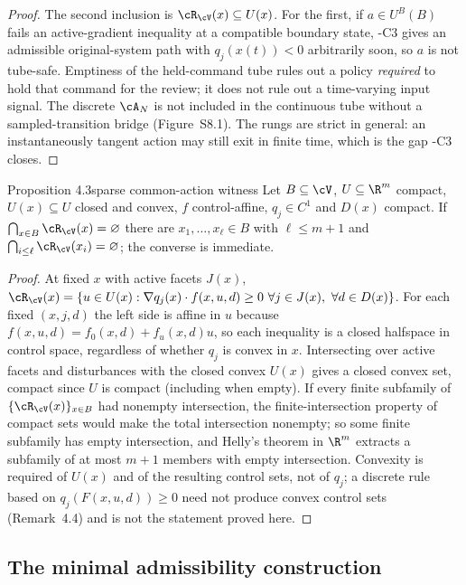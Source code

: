 \begin{proof}
The second inclusion is $\cR_\cV(x)\subseteq U(x)$. For the first, if $a\in U^B(B)$ fails an active-gradient inequality at a compatible boundary state, \hyp{C3} gives an admissible original-system path with $q_j(x(t))<0$ arbitrarily soon, so $a$ is not tube-safe. Emptiness of the held-command tube rules out a policy \emph{required} to hold that command for the review; it does not rule out a time-varying input signal. The discrete $\cA_N$ is not included in the continuous tube without a sampled-transition bridge (Figure~S8.1). The rungs are strict in general: an instantaneously tangent action may still exit in finite time, which is the gap \hyp{C3} closes.
\end{proof}

\begin{restated}{Proposition 4.3}{sparse common-action witness}\label{S:helly}
Let $B\subseteq\cV$, $U\subseteq\R^m$ compact, $U(x)\subseteq U$ closed and convex, $f$ control-affine, $q_j\in C^1$ and $D(x)$ compact. If $\bigcap_{x\in B}\cR_\cV(x)=\varnothing$ there are $x_1,\dots,x_\ell\in B$ with $\ell\le m+1$ and $\bigcap_{i\le\ell}\cR_\cV(x_i)=\varnothing$; the converse is immediate.
\end{restated}

\begin{proof}
At fixed $x$ with active facets $J(x)$, $\cR_\cV(x)=\{u\in U(x):\nabla q_j(x)\cdot f(x,u,d)\ge0\ \forall j\in J(x),\ \forall d\in D(x)\}$. For each fixed $(x,j,d)$ the left side is affine in $u$ because $f(x,u,d)=f_0(x,d)+f_u(x,d)u$, so each inequality is a closed halfspace in control space, regardless of whether $q_j$ is convex in $x$. Intersecting over active facets and disturbances with the closed convex $U(x)$ gives a closed convex set, compact since $U$ is compact (including when empty). If every finite subfamily of $\{\cR_\cV(x)\}_{x\in B}$ had nonempty intersection, the finite-intersection property of compact sets would make the total intersection nonempty; so some finite subfamily has empty intersection, and Helly's theorem in $\R^m$ \citep{helly1923} extracts a subfamily of at most $m+1$ members with empty intersection. Convexity is required of $U(x)$ and of the resulting control sets, not of $q_j$; a discrete rule based on $q_j(F(x,u,d))\ge0$ need not produce convex control sets (Remark~4.4) and is not the statement proved here.
\end{proof}

\subsection{The minimal admissibility construction}\label{S:emptiness}

